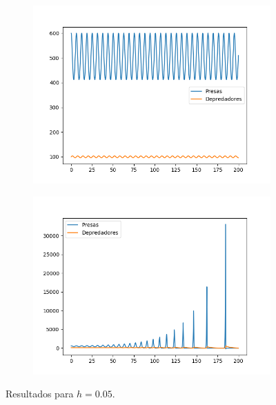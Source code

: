 \documentclass[11pt,a4paper]{article}
\begin{document}
\begin{figure}[H]
\centering
\begin{subfigure}{.5\textwidth}
	\centering
	\includegraphics[scale=0.45]{img/rk-0-05}
\end{subfigure}%
\begin{subfigure}{.5\textwidth}
	\centering
	\includegraphics[scale=0.45]{img/eu-0-05}
\end{subfigure}
\caption{Resultados para $h=0.05$.}
\label{fig:h-0.05}
\end{figure}
\end{document}
